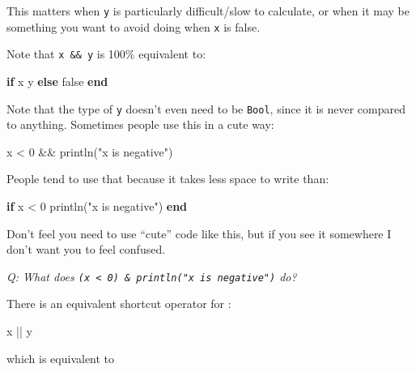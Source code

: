 \documentclass[
]{article}
\newenvironment{Shaded}{\begin{snugshade}}{\end{snugshade}}
\newcommand{\ConstantTok}[1]{\textcolor[rgb]{0.56,0.35,0.01}{#1}}
\newcommand{\ControlFlowTok}[1]{\textcolor[rgb]{0.00,0.23,0.31}{\textbf{#1}}}
\newcommand{\FloatTok}[1]{\textcolor[rgb]{0.68,0.00,0.00}{#1}}
\newcommand{\FunctionTok}[1]{\textcolor[rgb]{0.28,0.35,0.67}{#1}}
\newcommand{\NormalTok}[1]{\textcolor[rgb]{0.00,0.23,0.31}{#1}}
\newcommand{\OperatorTok}[1]{\textcolor[rgb]{0.37,0.37,0.37}{#1}}
\newcommand{\StringTok}[1]{\textcolor[rgb]{0.13,0.47,0.30}{#1}}
\begin{document}
This matters when \texttt{y} is particularly difficult/slow to
calculate, or when it may be something you want to avoid doing when
\texttt{x} is false.

Note that \texttt{x\ \&\&\ y} is 100\% equivalent to:

\begin{Shaded}
\begin{Highlighting}[]
\ControlFlowTok{if}\NormalTok{ x}
\NormalTok{   y}
\ControlFlowTok{else}
   \ConstantTok{false}
\ControlFlowTok{end}
\end{Highlighting}
\end{Shaded}

Note that the type of \texttt{y} doesn't even need to be \texttt{Bool},
since it is never compared to anything. Sometimes people use this in a
cute way:

\begin{Shaded}
\begin{Highlighting}[]
\NormalTok{x }\OperatorTok{\textless{}} \FloatTok{0} \OperatorTok{\&\&} \FunctionTok{println}\NormalTok{(}\StringTok{"x is negative"}\NormalTok{)}
\end{Highlighting}
\end{Shaded}

People tend to use that because it takes less space to write than:

\begin{Shaded}
\begin{Highlighting}[]
\ControlFlowTok{if}\NormalTok{ x }\OperatorTok{\textless{}} \FloatTok{0}
   \FunctionTok{println}\NormalTok{(}\StringTok{"x is negative"}\NormalTok{)}
\ControlFlowTok{end}
\end{Highlighting}
\end{Shaded}

Don't feel you need to use ``cute'' code like this, but if you see it
somewhere I don't want you to feel confused.

\emph{Q: What does
\texttt{(x\ \textless{}\ 0)\ \&\ println("x\ is\ negative")} do?}

There is an equivalent shortcut operator for \texttt{\textbar{}}:

\begin{Shaded}
\begin{Highlighting}[]
\NormalTok{x }\OperatorTok{||}\NormalTok{ y}
\end{Highlighting}
\end{Shaded}

which is equivalent to
\end{document}
